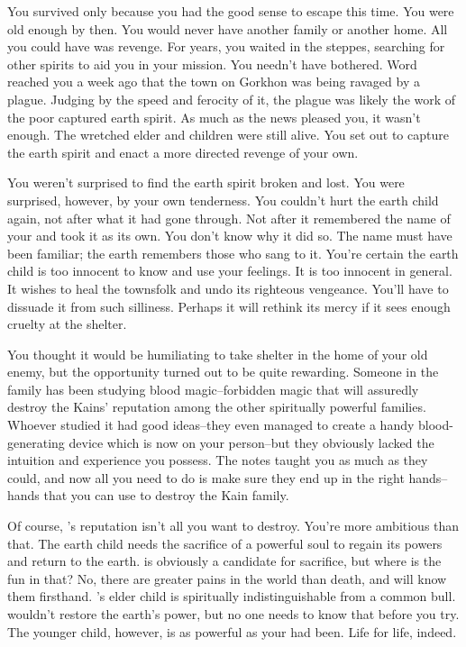 \documentclass[char]{Pestilence}
\begin{document}
You survived only because you had the good sense to escape this time. You were old enough by then. You would never have another family or another home. All you could have was revenge. For years, you waited in the steppes, searching for other spirits to aid you in your mission. You needn't have bothered. Word reached you a week ago that the town on Gorkhon was being ravaged by a plague. Judging by the speed and ferocity of it, the plague was likely the work of the poor captured earth spirit. As much as the news pleased you, it wasn't enough. The wretched elder and \cElder{\their} children were still alive. You set out to capture the earth spirit and enact a more directed revenge of your own.

You weren't surprised to find the earth spirit broken and lost. You were surprised, however, by your own tenderness. You couldn't hurt the earth child again, not after what it had gone through. Not after it remembered the name of your \cPlaguebearer{\offspring} and took it as its own. You don't know why it did so. The name must have been familiar; the earth remembers those who sang to it. You're certain the earth child is too innocent to know and use your feelings. It is too innocent in general. It wishes to heal the townsfolk and undo its righteous vengeance. You'll have to dissuade it from such silliness. Perhaps it will rethink its mercy if it sees enough cruelty at the shelter.

You thought it would be humiliating to take shelter in the home of your old enemy, but the opportunity turned out to be quite rewarding. Someone in the family has been studying blood magic--forbidden magic that will assuredly destroy the Kains' reputation among the other spiritually powerful families. Whoever studied it had good ideas--they even managed to create a handy blood-generating device which is now on your person--but they obviously lacked the intuition and experience you possess. The notes taught you as much as they could, and now all you need to do is make sure they end up in the right hands--hands that you can use to destroy the Kain family. 

Of course, \cElder{}'s reputation isn't all you want to destroy. You're more ambitious than that. The earth child needs the sacrifice of a powerful soul to regain its powers and return to the earth. \cElder{} is obviously a candidate for sacrifice, but where is the fun in that? No, there are greater pains in the world than death, and \cElder{} will know them firsthand. \cElder{}'s elder child is spiritually indistinguishable from a common bull. \cApprentice{\They} wouldn't restore the earth's power, but no one needs to know that before you try. The younger child, however, is as powerful as your \cPlaguebearer{} had been. Life for life, indeed.
\end{document}
